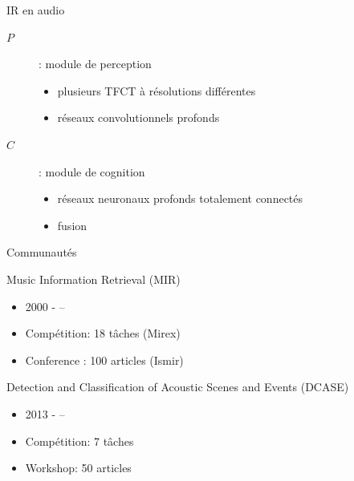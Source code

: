 \begin{frame}{IR en audio}
\begin{center}
\end{center}
\vspace{.8cm}
\begin{description}
\item[$P$]: module de \og perception \fg
\begin{itemize}
    \item plusieurs TFCT à résolutions différentes
    \item réseaux convolutionnels profonds
\end{itemize}
\item[$C$]: module de \og cognition \fg
\begin{itemize}
    \item réseaux neuronaux profonds totalement connectés
    \item fusion
\end{itemize}
\end{description}
\end{frame}


\begin{frame}{Communautés}
\begin{block}{Music Information Retrieval (MIR)}
\begin{itemize}
\item 2000 - --
\item Compétition: 18 tâches  (Mirex)
\item Conference : 100 articles (Ismir)
\end{itemize}
\end{block}
\begin{block}{Detection and Classification of
Acoustic Scenes and Events (DCASE)}
\begin{itemize}
\item 2013 - --
\item Compétition: 7 tâches
\item Workshop: 50 articles
\end{itemize}
\end{block}
\end{frame}




